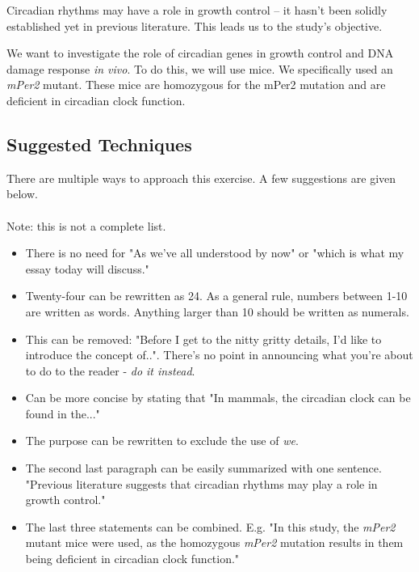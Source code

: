 \documentclass{article}
\begin{document}
Circadian rhythms may have a role in growth control – it hasn’t been solidly established yet in previous literature. This leads us to the study’s objective.

We want to investigate the role of circadian genes in growth control and DNA damage response \textit{in vivo}. To do this, we will use mice. We specifically used an \textit{mPer2} mutant. These mice are homozygous for the mPer2 mutation and are deficient in circadian clock function. 

\newpage
\subsection*{Suggested Techniques}

There are multiple ways to approach this exercise. A few suggestions are given below. 
\paragraph{} Note: this is not a complete list.

\begin{itemize}
\item There is no need for "As we've all understood by now" or "which is what my essay today will discuss."
\item Twenty-four can be rewritten as 24. As a general rule, numbers between 1-10 are written as words. Anything larger than 10 should be written as numerals.
\item This can be removed: "Before I get to the nitty gritty details, I’d like to introduce the concept of..". There's no point in announcing what you're about to do to the reader - \textit{do it instead}.
\item Can be more concise by stating that "In mammals, the circadian clock can be found in the..."
\item The purpose can be rewritten to exclude the use of \textit{we}.
\item The second last paragraph can be easily summarized with one sentence. "Previous literature suggests that circadian rhythms may play a role in growth control."
\item The last three statements can be combined. E.g. "In this study, the \textit{mPer2} mutant mice were used, as the homozygous \textit{mPer2} mutation results in them being deficient in circadian clock function."
\end{itemize}
\end{document}
